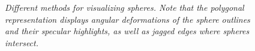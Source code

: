 \begin{figure}[!ht]
\centering
{}
\hspace{5mm}
\caption{\em Different methods for visualizing spheres. 
Note that the polygonal representation displays angular deformations of the sphere outlines and their specular highlights,
as well as jagged edges where spheres intersect.}
\label{f:methods}
\end{figure}
